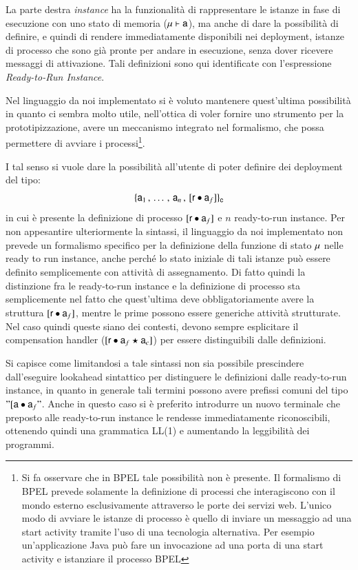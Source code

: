 La parte destra \emph{instance} ha la funzionalità di rappresentare le istanze in
fase di esecuzione con uno stato di memoria (${\sf \mu} \vdash {\sf a}$), ma anche di
dare la possibilità di definire, e quindi di rendere immediatamente disponibili
nei deployment, istanze di processo che sono già pronte per andare in
esecuzione, senza dover ricevere messaggi di attivazione.
Tali definizioni sono qui identificate con l'espressione
\emph{Ready-to-Run Instance}.

Nel linguaggio da noi implementato si è voluto mantenere quest'ultima
possibilità in quanto ci sembra molto utile, nell'ottica di voler fornire uno
strumento per la prototipizzazione, avere un meccanismo integrato nel
formalismo, che possa permettere di avviare i processi\footnote{Si fa osservare
che in BPEL tale possibilità non è presente. Il formalismo di BPEL prevede
solamente la definizione di processi che interagiscono con il mondo esterno
esclusivamente attraverso le porte dei servizi web. L'unico modo di avviare le
istanze di processo è quello di inviare un messaggio ad una start activity tramite l'uso
di una tecnologia alternativa. Per esempio un'applicazione Java può fare un
invocazione ad una porta di una start activity e istanziare il processo BPEL}.

I tal senso si vuole dare la possibilità all'utente di poter definire dei
deployment del tipo: 
$$
\{ 
{\sf a}_1 \,,\, \ldots \,,\, {\sf a}_n \,,\,
[{\sf r} \bullet {\sf a}_f]  
 \}_{{\sf c}}
$$
in cui è presente la definizione di processo  $[{\sf r} \bullet {\sf a}_f]$ e $n$
ready-to-run instance. Per non appesantire ulteriormente la sintassi, il
linguaggio da noi implementato non prevede un formalismo specifico per la definizione della funzione di stato ${\sf \mu}$ nelle ready to run instance, anche perché lo stato
iniziale di tali istanze può essere definito semplicemente con attività di
assegnamento. Di fatto quindi la distinzione fra le ready-to-run instance e la
definizione di processo sta semplicemente nel fatto che quest'ultima deve
obbligatoriamente avere la struttura  $[{\sf r} \bullet {\sf a}_f]$, mentre le prime
possono essere generiche attività strutturate. Nel caso quindi queste siano dei
contesti, devono sempre esplicitare il compensation handler
($[{\sf r} \bullet {\sf a}_f \star {\sf a}_c]$) per essere distinguibili dalle definizioni.

Si capisce come limitandosi a tale sintassi non sia possibile prescindere
dall'eseguire lookahead sintattico per distinguere le definizioni dalle
ready-to-run instance, in quanto in generale tali termini possono avere prefissi comuni del tipo $"[{\sf a} \bullet {\sf a}_f"$. Anche in questo caso si è preferito
introdurre un nuovo terminale che preposto alle ready-to-run instance le
rendesse immediatamente riconoscibili, ottenendo quindi una grammatica LL(1)
e aumentando la leggibilità dei programmi.

